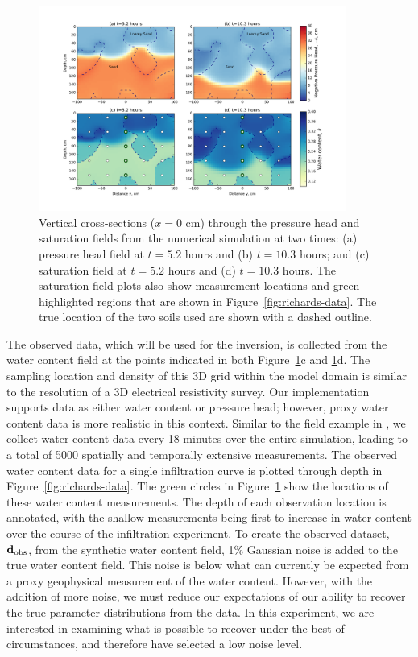 \documentclass[preprint,review,3p,times,onecolumn,authoryear]{elsarticle}
\newcommand{\bfdo}{\mathbf{d}_{\rm obs}}
\begin{document}
\begin{figure}[!htbp]
\begin{center}
\includegraphics[width=0.9\textwidth]{fields.png}
\end{center}
\caption{Vertical cross-sections ($x=0$ cm) through the pressure head and saturation fields from the numerical simulation at two times: (a) pressure head field at $t=5.2$ hours and (b) $t=10.3$ hours; and (c) saturation field at $t=5.2$ hours and (d) $t=10.3$ hours. The saturation field plots also show measurement locations and green highlighted regions that are shown in Figure~\ref{fig:richards-data}. The true location of the two soils used are shown with a dashed outline.}
\label{fig:richards-fields}
\end{figure}

The observed data, which will be used for the inversion, is collected from the water content field at the points indicated in both Figure~\ref{fig:richards-fields}c and \ref{fig:richards-fields}d. The sampling location and density of this 3D grid within the model domain is similar to the resolution of a 3D electrical resistivity survey. Our implementation supports data as either water content or pressure head; however, proxy water content data is more realistic in this context. Similar to the field example in \cite{Pidlisecky2013}, we collect water content data every 18 minutes over the entire simulation, leading to a total of 5000 spatially and temporally extensive measurements. The observed water content data for a single infiltration curve is plotted through depth in Figure~\ref{fig:richards-data}. The green circles in Figure~\ref{fig:richards-fields} show the locations of these water content measurements. The depth of each observation location is annotated, with the shallow measurements being first to increase in water content over the course of the infiltration experiment. To create the observed dataset, $\bfdo$, from the synthetic water content field, 1\% Gaussian noise is added to the true water content field.  This noise is below what can currently be expected from a proxy geophysical measurement of the water content. However, with the addition of more noise, we must reduce our expectations of our ability to recover the true parameter distributions from the data. In this experiment, we are interested in examining what is possible to recover under the best of circumstances, and therefore have selected a low noise level.
\end{document}
